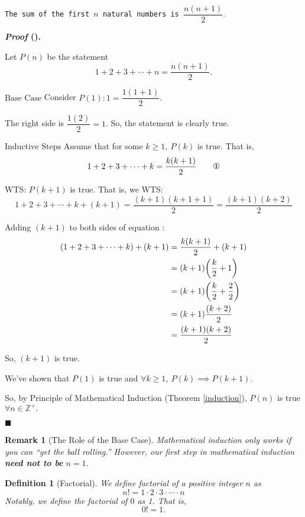 \documentclass[12pt,a4paper]{article}
\newtheorem{df}{Definition}[subsection]
\newcounter{nprf}[subsection]
\newtheorem*{rmk}{\indent Remark}
\newenvironment*{prf}{\par\indent\textbf{\textit{Proof} (\stepcounter{nprf}\thenprf). }\par}{\par\hfill $\blacksquare$\par}
\def\Z{{\mathbb{Z}}}
\def\Zp{{\Z^{+}}}
\begin{document}
\begin{framed}
\noindent\texttt{The sum of the first $n$ natural numbers is $\dfrac{n(n+1)}{2}.$}
\begin{prf}
	Let $P(n)$ be the statement \[1+2+3+\cdots+n=\frac{n(n+1)}{2}.\]\par $\boxed{\text{Base Case}}$ Consider $P(1): 1=\dfrac{1(1+1)}{2}$.\par\hspace{5mm} The right side is $\dfrac{1(2)}{2}=1$. So, the statement is clearly true.\par $\boxed{\text{Inductive Steps}}$ Assume that for some $k\geq1,\ P(k)$ is true. That is, \[1+2+3+\cdots+k=\dfrac{k(k+1)}{2}\qquad\text{\ding{172}}\]\par\hspace{5mm} WTS: $P(k+1)$ is true. That is, we WTS: \[1+2+3+\cdots+k+(k+1)=\dfrac{(k+1)(k+1+1)}{2}=\dfrac{(k+1)(k+2)}{2}\]\par\hspace{5mm} Adding $(k+1)$ to both sides of equation : \[\begin{aligned} (1+2+3+\cdots+k)+(k+1)&=\dfrac{k(k+1)}{2}+(k+1)\\&=(k+1)\qty(\dfrac{k}{2}+1)\\&=(k+1)\qty(\dfrac{k}{2}+\dfrac{2}{2})\\&=(k+1)\dfrac{(k+2)}{2}\\&=\dfrac{(k+1)(k+2)}{2}\end{aligned}\]\par\hspace{5mm} So, $(k+1)$ is true. \par We've shown that $P(1)$ is true and $\forall k\geq1,\ P(k)\implies P(k+1).$\par So, by Principle of Mathematical Induction (Theorem \ref{induction}), $P(n)$ is true $\forall n\in\Zp.$
\end{prf}
\end{framed}
\begin{rmk}[The Role of the Base Case]
	Mathematical induction only works if you can ``get the ball rolling.'' However, our first step in mathematical induction \textbf{need not to be} $n=1.$
\end{rmk}
\begin{df}[Factorial]
	We define factorial of a positive integer $n$ as \[n!=1\cdot2\cdot3\cdot\cdots\cdot n\] Notably, we define the factorial of $0$ as 1. That is, \[0!=1.\]
\end{df}
\end{document}
